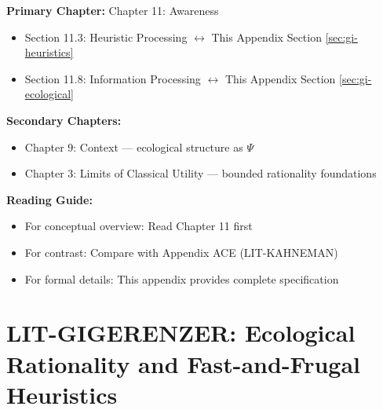 \begin{tcolorbox}[colback=purple!5!white, colframe=purple!75!black,
    title=Chapter Linkage]

\textbf{Primary Chapter:} Chapter 11: Awareness
\begin{itemize}[nosep]
\item Section 11.3: Heuristic Processing $\leftrightarrow$ This Appendix Section \ref{sec:gi-heuristics}
\item Section 11.8: Information Processing $\leftrightarrow$ This Appendix Section \ref{sec:gi-ecological}
\end{itemize}

\textbf{Secondary Chapters:}
\begin{itemize}[nosep]
\item Chapter 9: Context --- ecological structure as $\Psi$
\item Chapter 3: Limits of Classical Utility --- bounded rationality foundations
\end{itemize}

\textbf{Reading Guide:}
\begin{itemize}[nosep]
\item For conceptual overview: Read Chapter 11 first
\item For contrast: Compare with Appendix ACE (LIT-KAHNEMAN)
\item For formal details: This appendix provides complete specification
\end{itemize}

\end{tcolorbox}


\chapter{LIT-GIGERENZER: Ecological Rationality and Fast-and-Frugal Heuristics}
\label{app:lit-gigerenzer}


\begin{abstract}
This appendix integrates Gerd Gigerenzer's research program into the EBF framework.
Gigerenzer's work establishes that: (1) simple heuristics can outperform complex
optimization in uncertain environments (less-is-more); (2) rationality should be
evaluated by fit between decision strategy and environment structure (ecological
rationality); (3) risk communication improves with natural frequencies over
probabilities. His contributions provide an alternative to the ``bias'' framing,
showing when heuristics are adaptive rather than erroneous. 19 papers spanning
1987-2011 are integrated, offering a complementary perspective to Kahneman-Tversky.
\end{abstract}


